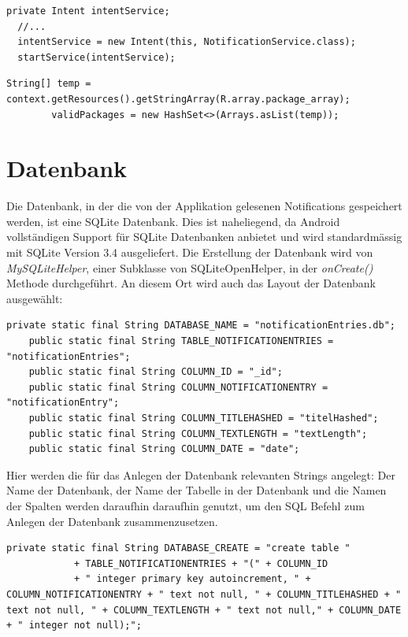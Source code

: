 \begin{lstlisting}[frame=single, caption = startService(), label=oncreateService] 
  private Intent intentService;
  //...
  intentService = new Intent(this, NotificationService.class);
  startService(intentService);
\end{lstlisting}

\begin{lstlisting}[frame=single, caption = Package Überprüfung, label=validpackage] 
String[] temp = context.getResources().getStringArray(R.array.package_array);
        validPackages = new HashSet<>(Arrays.asList(temp));
\end{lstlisting}



\section{Datenbank}
\label{ch:Implementierung:sec:Datenbank}


Die Datenbank, in der die von der Applikation gelesenen Notifications gespeichert werden, ist eine SQLite Datenbank.
Dies ist naheliegend, da Android vollständigen Support für SQLite Datenbanken anbietet und wird standardmässig mit SQLite Version 3.4 ausgeliefert.
Die Erstellung der Datenbank wird von \emph{MySQLiteHelper}, einer Subklasse von SQLiteOpenHelper, in der \emph{onCreate()} Methode durchgeführt.
An diesem Ort wird auch das Layout der Datenbank ausgewählt:

\begin{lstlisting}[frame=single, caption = Datenbank Strings, label=databasestrings] 
    private static final String DATABASE_NAME = "notificationEntries.db";
    public static final String TABLE_NOTIFICATIONENTRIES = "notificationEntries"; 
    public static final String COLUMN_ID = "_id";
    public static final String COLUMN_NOTIFICATIONENTRY = "notificationEntry";
    public static final String COLUMN_TITLEHASHED = "titelHashed";
    public static final String COLUMN_TEXTLENGTH = "textLength";
    public static final String COLUMN_DATE = "date";
\end{lstlisting}

Hier werden die für das Anlegen der Datenbank relevanten Strings angelegt:
Der Name der Datenbank, der Name der Tabelle in der Datenbank und die Namen der Spalten werden daraufhin daraufhin genutzt, um den SQL Befehl zum Anlegen der Datenbank zusammenzusetzen.

\begin{lstlisting}[frame=single, caption = Datenbank Creation String, label=databasecreation] 
    private static final String DATABASE_CREATE = "create table "
            + TABLE_NOTIFICATIONENTRIES + "(" + COLUMN_ID
            + " integer primary key autoincrement, " + COLUMN_NOTIFICATIONENTRY + " text not null, " + COLUMN_TITLEHASHED + " text not null, " + COLUMN_TEXTLENGTH + " text not null," + COLUMN_DATE + " integer not null);";

\end{lstlisting}

